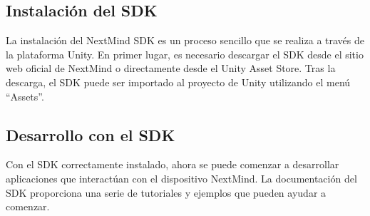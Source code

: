 \subsection{Instalación del SDK}

La instalación del NextMind SDK es un proceso sencillo que se realiza a través de la plataforma Unity. En primer lugar, es necesario descargar el SDK desde el sitio web oficial de NextMind o directamente desde el Unity Asset Store. Tras la descarga, el SDK puede ser importado al proyecto de Unity utilizando el menú ``Assets''.

\subsection{Desarrollo con el SDK}

Con el SDK correctamente instalado, ahora se puede comenzar a desarrollar aplicaciones que interactúan con el dispositivo NextMind. La documentación del SDK proporciona una serie de tutoriales y ejemplos que pueden ayudar a comenzar.
